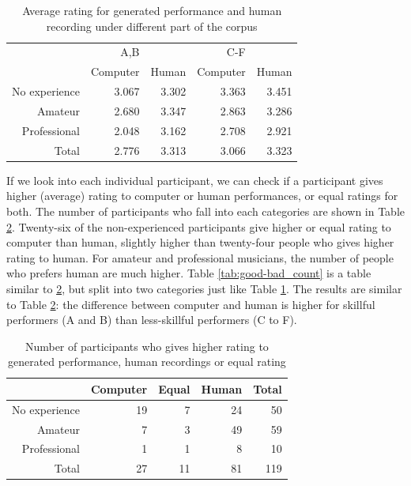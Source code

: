 \begin{table}
   \centering
   \caption{Average rating for generated performance and human recording under different part of the corpus}
   \label{tab:good-bad_rating}
   \begin{tabular}{r|rr|rr}
\hline
&A,B&&C-F&\\
&Computer &Human &Computer &Human \\
\hline
No experience&3.067&3.302&3.363&3.451\\
Amateur&2.680&3.347&2.863&3.286\\
Professional&2.048&3.162&2.708&2.921\\
\hline
Total&2.776&3.313&3.066&3.323\\
\hline
   \end{tabular}
\end{table}

If we look into each individual participant, we can check if a participant gives higher (average) rating to computer or human performances, or equal ratings for both. The number of participants who fall into each categories are shown in Table \ref{tab:avg_count}. Twenty-six of the non-experienced participants give higher or equal rating to computer than human, slightly higher than twenty-four people who gives higher rating to human. For amateur and professional musicians, the number of people who prefers human are much higher. Table \ref{tab:good-bad_count} is a table similar to \ref{tab:avg_count}, but split into two categories just like Table \ref{tab:good-bad_rating}. The results are similar to Table \ref{tab:avg_count}: the difference between computer and human is higher for skillful performers (A and B) than less-skillful performers (C to F).


\begin{table}
   \centering
   \caption{Number of participants who gives higher rating to generated performance, human recordings or equal rating}
   \label{tab:avg_count}
   \begin{tabular}{r|rrr|r}
      \hline
      &Computer&Equal&Human&Total\\
      \hline
      No experience&19&7&24&50\\
      Amateur&7&3&49&59\\
      Professional&1&1&8&10\\
      \hline
      Total&27&11&81&119\\
      \hline
   \end{tabular}
\end{table}


